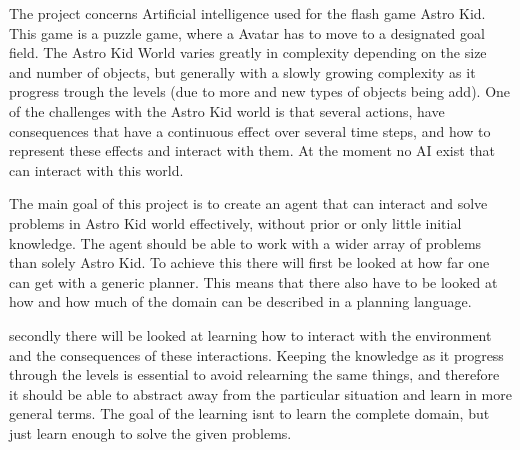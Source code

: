 The project concerns Artificial intelligence used for the flash game Astro Kid. This game is a puzzle game, where a Avatar has to move to a designated goal field. The Astro Kid World varies greatly in complexity depending on the size and number of objects, but generally with a slowly growing complexity as it progress trough the levels (due to more and new types of objects being add). One of the challenges with the Astro Kid world is that several actions, have consequences that have a continuous effect over several time steps, and how to represent these effects and interact with them. At the moment no AI exist that can interact with this world. 

The main goal of this project is to create an agent that can interact and solve problems in Astro Kid world effectively, without prior or only little initial knowledge. The agent should be able to work with a wider array of problems than solely Astro Kid. To achieve this there will first be looked at how far one can get with a generic planner. This means that there also have to be looked at how and how much of the domain can be described in a planning language. 

secondly there will be looked at learning how to interact with the environment and the consequences of these interactions. Keeping the knowledge as it progress through the levels is essential to avoid relearning the same things, and therefore it should be able to abstract away from the particular situation and learn in more general terms. The goal of the learning isnt to learn the complete domain, but just learn enough to solve the given problems.

%
